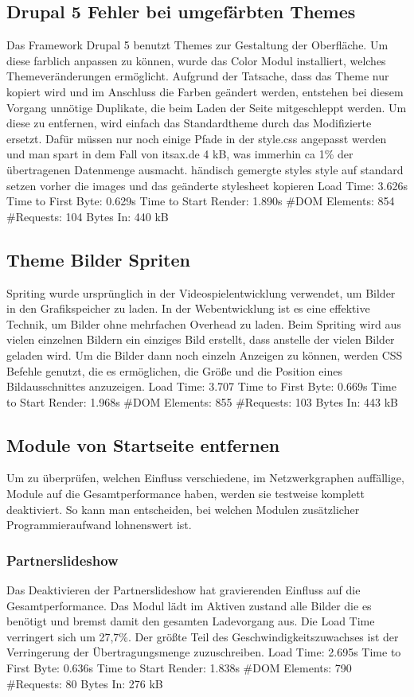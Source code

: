 \subsection{Drupal 5 Fehler bei umgefärbten Themes}
Das Framework Drupal 5 benutzt Themes zur Gestaltung der Oberfläche. Um diese farblich anpassen zu können, wurde das Color Modul installiert, welches Themeveränderungen ermöglicht. Aufgrund der Tatsache, dass das Theme nur kopiert wird und im Anschluss die Farben geändert werden, entstehen bei diesem Vorgang unnötige Duplikate, die beim Laden der Seite mitgeschleppt werden. Um diese zu entfernen, wird einfach das Standardtheme durch das Modifizierte ersetzt. Dafür müssen  nur noch einige Pfade in der style.css angepasst werden und man spart in dem Fall von itsax.de 4 kB, was immerhin ca 1\% der übertragenen Datenmenge ausmacht. 
händisch gemergte styles
style auf standard setzen
vorher die images und das geänderte stylesheet kopieren
Load Time: 3.626s
Time to First Byte: 0.629s %
Time to Start Render: 1.890s
\#DOM Elements: 854 	
\#Requests: 104 %
Bytes In: 440 kB %

\subsection{Theme Bilder Spriten}
Spriting wurde ursprünglich in der Videospielentwicklung verwendet, um Bilder in den Grafikspeicher zu laden. In der Webentwicklung ist es eine effektive Technik, um Bilder ohne mehrfachen Overhead zu laden. Beim Spriting wird aus vielen einzelnen Bildern ein einziges Bild erstellt, dass anstelle der vielen Bilder geladen wird. Um die Bilder dann noch einzeln Anzeigen zu können, werden CSS Befehle genutzt, die es ermöglichen, die Größe und die Position eines Bildausschnittes anzuzeigen. 
Load Time: 3.707
Time to First Byte: 0.669s %
Time to Start Render: 1.968s
\#DOM Elements: 855 	
\#Requests: 103 
Bytes In: 443 kB 

\subsection{Module von Startseite entfernen}
Um zu überprüfen, welchen Einfluss verschiedene, im Netzwerkgraphen auffällige, Module auf die Gesamtperformance haben, werden sie testweise komplett deaktiviert. So kann man entscheiden, bei welchen Modulen zusätzlicher Programmieraufwand lohnenswert ist.
\subsubsection{Partnerslideshow} Das Deaktivieren der Partnerslideshow hat gravierenden Einfluss auf die Gesamtperformance. Das Modul lädt im Aktiven zustand alle Bilder die es benötigt und bremst damit den gesamten Ladevorgang aus. Die Load Time verringert sich um 27,7\%. Der größte Teil des Geschwindigkeitszuwachses ist der Verringerung der Übertragungsmenge zuzuschreiben. 
Load Time: 2.695s
Time to First Byte: 0.636s %
Time to Start Render: 1.838s
\#DOM Elements: 790
\#Requests: 80
Bytes In: 276 kB

